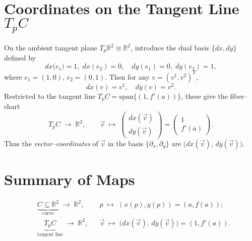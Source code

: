 \documentclass[12pt]{article}
\renewcommand{\span}{\text{span}}
\begin{document}
	\section{Coordinates on the Tangent Line \(T_pC\)}
	
	On the ambient tangent plane \(T_p\mathbb{R}^2\cong\mathbb{R}^2\), introduce the dual basis
	\(\{dx,dy\}\) defined by
	\[
	dx\bigl(e_1\bigr)=1,\;dx(e_2)=0,
	\quad
	dy(e_1)=0,\;dy(e_2)=1,
	\]
	where \(e_1=(1,0)\), \(e_2=(0,1)\).  Then for any \(v=(v^1,v^2)^T\),
	\[
	dx(v)=v^1,
	\quad
	dy(v)=v^2.
	\]
	Restricted to the tangent line \(T_pC=\span\{(1,f'(a))\}\), these give the fiber–chart
	\[
	T_pC\;\longrightarrow\;\mathbb{R}^2,
	\qquad
	\vec v\;\mapsto\;
	\begin{pmatrix}
		dx(\vec v)\\[4pt]
		dy(\vec v)
	\end{pmatrix}
	=
	\begin{pmatrix}
		1\\
		f'(a)
	\end{pmatrix}.
	\]
	Thus the \emph{vector–coordinates} of \(\vec v\) in the basis \(\{\partial_x,\partial_y\}\)
	are \(\bigl(dx(\vec v),\,dy(\vec v)\bigr)\).
	
	\section{Summary of Maps}
	
\[
\begin{array}{ccccc}
&\underbrace{C\subseteq\mathbb{R}^2}_{\text{curve}}
\;\longrightarrow\;\mathbb{R}^2,
&&
p\;\longmapsto\;(x(p),y(p))=(a,f(a));\\
&\underbrace{T_pC}_{\text{tangent line}}
\;\longrightarrow\;\mathbb{R}^2,
&&
\vec v\;\longmapsto\;\bigl(dx(\vec v),\,dy(\vec v)\bigr)
=(1,f'(a)).
\end{array}
\]
	
\end{document}
